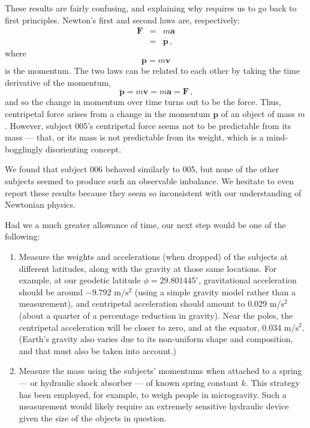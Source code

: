 \documentclass[10pt]{article}
\theoremstyle{definition}
\begin{document}
These results are fairly confusing, and explaining why requires us to go back to first principles.
Newton's first and second laws are, respectively:
%
\begin{eqnarray}
\mathbf{F} &=& m \mathbf{a} \\
 &=& \dot{\mathbf{p}}\,\textrm{,}
\end{eqnarray}
%
where
%
\begin{equation}
\mathbf{p} = m \mathbf{v}
\end{equation}
%
is the momentum.
%
The two laws can be related to each other by taking the time derivative of the momentum,
%
\begin{equation}
\dot{\mathbf{p}} = m \dot{\mathbf{v}} = m \mathbf{a} = \mathbf{F}\,\textrm{,}
\end{equation}
%
and so the change in momentum over time turns out to be the force.
Thus, centripetal force arises from a change in the momentum $\mathbf{p}$ of an object of mass $m$.
However, subject 005's centripetal force seems not to be predictable from its mass --- that, or its mass is not predictable from its weight, which is a mind-bogglingly disorienting concept.

We found that subject 006 behaved similarly to 005, but none of the other subjects seemed to produce such an observable imbalance.
We hesitate to even report these results because they seem so inconsistent with our understanding of Newtonian physics.

Had we a much greater allowance of time, our next step would be one of the following:
\begin{enumerate}
\item Measure the weights and accelerations (when dropped) of the subjects at different latitudes, along with the gravity at those same locations. For example, at our geodetic latitude $\phi=29.801445^\circ$, gravitational acceleration should be around $-9.792\textrm{ m}/\textrm{s}^2$ (using a simple gravity model rather than a measurement), and centripetal acceleration should amount to 0.029 $\textrm{m}/\textrm{s}^2$ (about a quarter of a percentage reduction in gravity). Near the poles, the centripetal acceleration will be closer to zero, and at the equator, 0.034 $\textrm{m}/\textrm{s}^2$. (Earth's gravity also varies due to its non-uniform shape and composition, and that must also be taken into account.)
\item Measure the mass using the subjects' momentums when attached to a spring --- or hydraulic shock absorber --- of known spring constant $k$. This strategy has been employed, for example, to weigh people in microgravity. Such a measurement would likely require an extremely sensitive hydraulic device given the size of the objects in question.
\end{enumerate}
\end{document}
